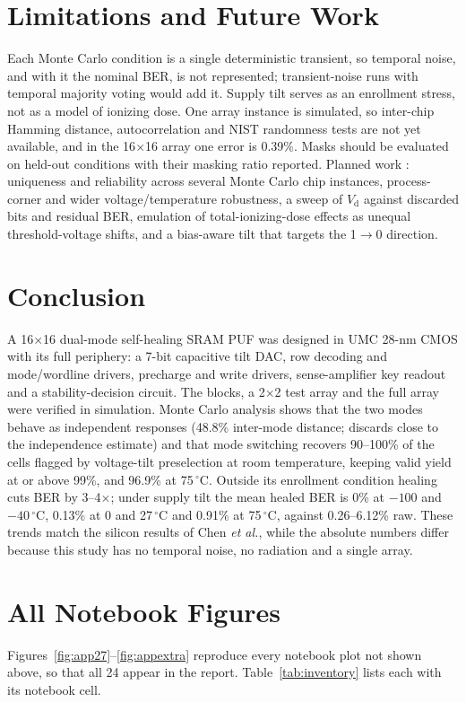 \documentclass[journal]{IEEEtran}
\newcommand{\Vd}{V_{\mathrm{d}}}
\begin{document}
\section{Limitations and Future Work}
Each Monte Carlo condition is a single deterministic transient, so temporal noise, and with it the nominal BER, is not represented; transient-noise runs with temporal majority voting would add it. Supply tilt serves as an enrollment stress, not as a model of ionizing dose. One array instance is simulated, so inter-chip Hamming distance, autocorrelation and NIST randomness tests are not yet available, and in the 16$\times$16 array one error is 0.39\%. Masks should be evaluated on held-out conditions with their masking ratio reported. Planned work \cite{phase0,phase2}: uniqueness and reliability across several Monte Carlo chip instances, process-corner and wider voltage/temperature robustness, a sweep of $\Vd$ against discarded bits and residual BER, emulation of total-ionizing-dose effects as unequal threshold-voltage shifts, and a bias-aware tilt that targets the 1$\rightarrow$0 direction.

\section{Conclusion}
A 16$\times$16 dual-mode self-healing SRAM PUF was designed in UMC 28-nm CMOS with its full periphery: a 7-bit capacitive tilt DAC, row decoding and mode/wordline drivers, precharge and write drivers, sense-amplifier key readout and a stability-decision circuit. The blocks, a 2$\times$2 test array and the full array were verified in simulation. Monte Carlo analysis shows that the two modes behave as independent responses (48.8\% inter-mode distance; discards close to the independence estimate) and that mode switching recovers 90--100\% of the cells flagged by voltage-tilt preselection at room temperature, keeping valid yield at or above 99\%, and 96.9\% at 75\,$^\circ$C. Outside its enrollment condition healing cuts BER by 3--4$\times$; under supply tilt the mean healed BER is 0\% at $-100$ and $-40\,^\circ$C, 0.13\% at 0 and 27\,$^\circ$C and 0.91\% at 75\,$^\circ$C, against 0.26--6.12\% raw. These trends match the silicon results of Chen \emph{et al.}, while the absolute numbers differ because this study has no temporal noise, no radiation and a single array.

\appendices
\section{All Notebook Figures}
Figures~\ref{fig:app27}--\ref{fig:appextra} reproduce every notebook plot not shown above, so that all 24 appear in the report. Table~\ref{tab:inventory} lists each with its notebook cell.
\end{document}
